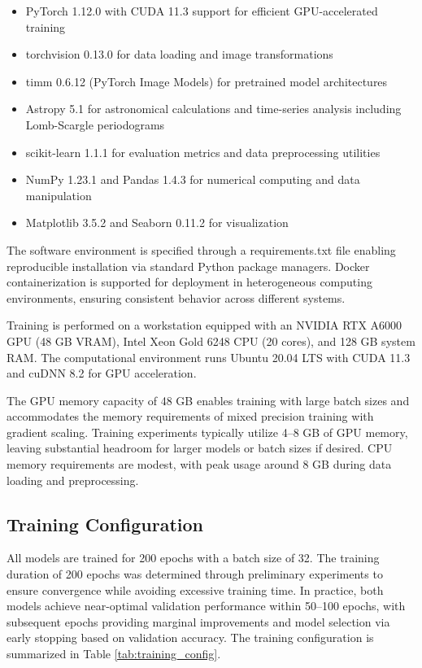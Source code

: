 \documentclass[11pt,a4paper]{article}
\begin{document}
\begin{itemize}
    \item PyTorch 1.12.0 with CUDA 11.3 support for efficient GPU-accelerated training
    \item torchvision 0.13.0 for data loading and image transformations
    \item timm 0.6.12 (PyTorch Image Models) for pretrained model architectures
    \item Astropy 5.1 for astronomical calculations and time-series analysis including Lomb-Scargle periodograms
    \item scikit-learn 1.1.1 for evaluation metrics and data preprocessing utilities
    \item NumPy 1.23.1 and Pandas 1.4.3 for numerical computing and data manipulation
    \item Matplotlib 3.5.2 and Seaborn 0.11.2 for visualization
\end{itemize}

The software environment is specified through a requirements.txt file enabling reproducible installation via standard Python package managers. Docker containerization is supported for deployment in heterogeneous computing environments, ensuring consistent behavior across different systems.

Training is performed on a workstation equipped with an NVIDIA RTX A6000 GPU (48 GB VRAM), Intel Xeon Gold 6248 CPU (20 cores), and 128 GB system RAM. The computational environment runs Ubuntu 20.04 LTS with CUDA 11.3 and cuDNN 8.2 for GPU acceleration.

The GPU memory capacity of 48 GB enables training with large batch sizes and accommodates the memory requirements of mixed precision training with gradient scaling. Training experiments typically utilize 4--8 GB of GPU memory, leaving substantial headroom for larger models or batch sizes if desired. CPU memory requirements are modest, with peak usage around 8 GB during data loading and preprocessing.

\subsection{Training Configuration}

All models are trained for 200 epochs with a batch size of 32. The training duration of 200 epochs was determined through preliminary experiments to ensure convergence while avoiding excessive training time. In practice, both models achieve near-optimal validation performance within 50--100 epochs, with subsequent epochs providing marginal improvements and model selection via early stopping based on validation accuracy. The training configuration is summarized in Table \ref{tab:training_config}.
\end{document}
